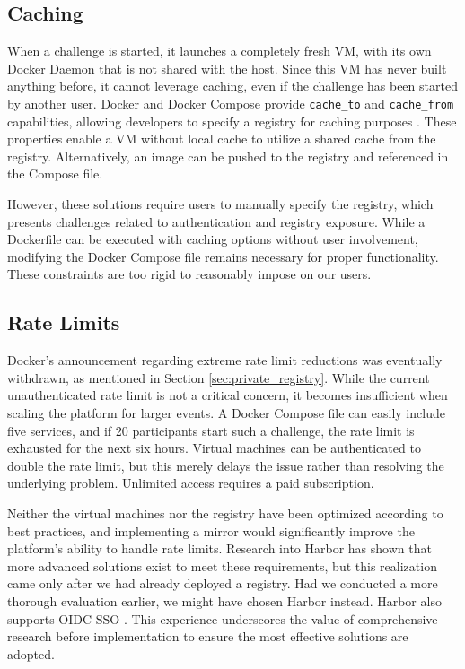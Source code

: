 \subsection{Caching}
When a challenge is started, it launches a completely fresh VM, with its own Docker Daemon that is not shared with the host. Since this VM has never built anything before, it cannot leverage caching, even if the challenge has been started by another user. Docker and Docker Compose provide \texttt{cache\_to} and \texttt{cache\_from} capabilities, allowing developers to specify a registry for caching purposes \parencite{docker_cache}\parencite{docker_compose_build}. These properties enable a VM without local cache to utilize a shared cache from the registry. Alternatively, an image can be pushed to the registry and referenced in the Compose file.

However, these solutions require users to manually specify the registry, which presents challenges related to authentication and registry exposure. While a Dockerfile can be executed with caching options without user involvement, modifying the Docker Compose file remains necessary for proper functionality. These constraints are too rigid to reasonably impose on our users.

\subsection{Rate Limits}
Docker's announcement regarding extreme rate limit reductions was eventually withdrawn, as mentioned in Section \ref{sec:private_registry}. While the current unauthenticated rate limit is not a critical concern, it becomes insufficient when scaling the platform for larger events. A Docker Compose file can easily include five services, and if 20 participants start such a challenge, the rate limit is exhausted for the next six hours. Virtual machines can be authenticated to double the rate limit, but this merely delays the issue rather than resolving the underlying problem. Unlimited access requires a paid subscription.

Neither the virtual machines nor the registry have been optimized according to best practices, and implementing a mirror would significantly improve the platform's ability to handle rate limits. Research into Harbor has shown that more advanced solutions exist to meet these requirements, but this realization came only after we had already deployed a registry. Had we conducted a more thorough evaluation earlier, we might have chosen Harbor instead. Harbor also supports OIDC SSO \parencite{harbor_oidc}. This experience underscores the value of comprehensive research before implementation to ensure the most effective solutions are adopted.

